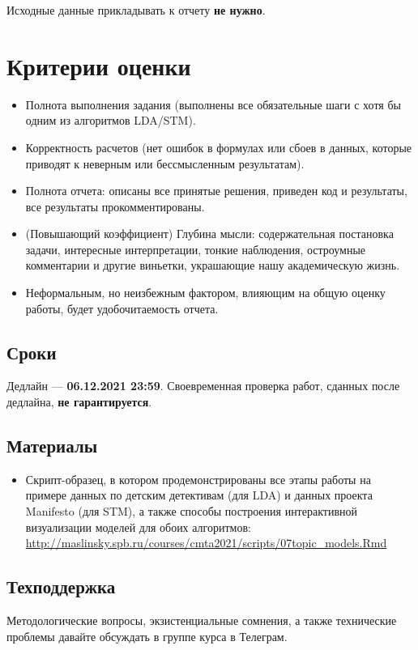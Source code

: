 \documentclass{report}
\begin{document}
Исходные данные прикладывать к отчету \textbf{не нужно}.

\section{Критерии оценки}

\begin{itemize}
\item Полнота выполнения задания (выполнены все обязательные шаги с
  хотя бы одним из алгоритмов LDA/STM). 
\item Корректность расчетов (нет ошибок в формулах или сбоев в данных,
  которые приводят к неверным или бессмысленным результатам).
\item Полнота отчета: описаны все принятые решения, приведен код и
  результаты, все результаты прокомментированы.
\item (Повышающий коэффициент) Глубина мысли: содержательная
  постановка задачи, интересные интерпретации, тонкие наблюдения,
  остроумные комментарии и другие виньетки, украшающие нашу
  академическую жизнь.
\item Неформальным, но неизбежным фактором, влияющим на общую оценку
  работы, будет удобочитаемость отчета.
\end{itemize}

\subsection{Сроки} 

Дедлайн — \textbf{06.12.2021 23:59}. Своевременная проверка работ, сданных
после дедлайна, \textbf{не гарантируется}. 

\subsection{Материалы}

\begin{itemize}
\item Скрипт-образец, в котором продемонстрированы все этапы работы на
  примере данных по детским детективам (для LDA) и данных проекта
  Manifesto (для STM), а также способы построения интерактивной
  визуализации моделей для обоих алгоритмов:
  \url{http://maslinsky.spb.ru/courses/cmta2021/scripts/07topic_models.Rmd}
\end{itemize}

\subsection{Техподдержка}

Методологические вопросы, экзистенциальные сомнения, а также
технические проблемы давайте обсуждать в группе курса в Телеграм.
\end{document}
